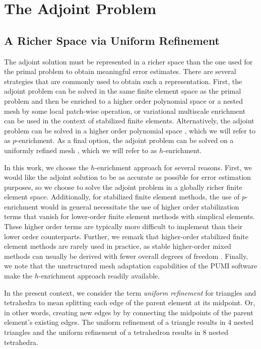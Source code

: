 \section{The Adjoint Problem}
\label{sec:aut_adjoint}

\subsection{A Richer Space via Uniform Refinement}

The adjoint solution must be represented in a richer
space than the one used for the primal problem to obtain meaningful error
estimates. There are several strategies that are commonly used to obtain
such a representation. First, the adjoint problem can be solved in the same
finite element space as the primal problem and then be enriched to a higher
order polynomial space \cite{becker2001optimal} or a nested mesh
\cite{nemec2007adjoint} by some local patch-wise operation, or variational
multiscale enrichment \cite{granzow2017output} can be used in the context
of stabilized finite elements. Alternatively, the adjoint problem can be solved in a
higher order polynomial space \cite{fidkowski2011output}, which we will refer
to as $p$-enrichment. As a final option, the adjoint problem can be solved on a
uniformly refined mesh \cite{burstedde2009parallel}, which we will refer to
as $h$-enrichment.

In this work, we choose the $h$-enrichment approach for several reasons.
First, we would like the adjoint solution to be as accurate as possible
for error estimation purposes, so we choose to solve the adjoint problem in
a globally richer finite element space. Additionally, for stabilized finite
element methods, the use of $p$-enrichment would in general necessitate the
use of higher order stabilization terms that vanish for lower-order finite
element methods with simplical elements. These higher order terms are
typically more difficult to implement than their lower order counterparts.
Further, we remark that higher-order stabilized finite element methods are
rarely used in practice, as stable higher-order mixed methods can usually
be derived with fewer overall degrees of freedom \cite{taylor1973numerical}.
Finally, we note that the unstructured mesh adaptation capabilities of the
PUMI software make the $h$-enrichment approach readily available.

In the present context, we consider the term \emph{uniform refinement}
for triangles and tetrahedra to mean splitting each edge of the parent
element at its midpoint. Or, in other words, creating new edges by
by connecting the midpoints of the parent element's existing edges.
The uniform refinement of a triangle results in 4 nested triangles
and the uniform refinement of a tetrahedron results in 8 nested
tetrahedra.

